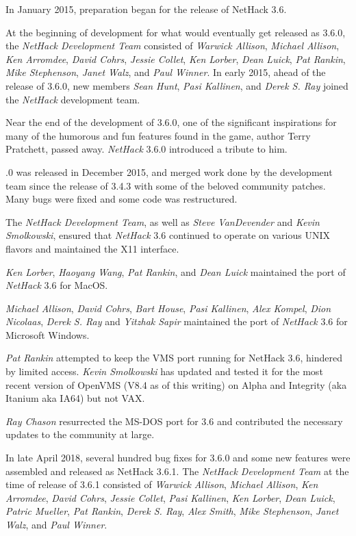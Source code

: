\medskip
In January 2015, preparation began for the release of NetHack 3.6.

\medskip
At the beginning of development for what would eventually get released as
3.6.0, the {\it NetHack Development Team} consisted of {\it Warwick Allison},
{\it Michael Allison}, {\it Ken Arromdee},
{\it David Cohrs}, {\it Jessie Collet},
{\it Ken Lorber}, {\it Dean Luick}, {\it Pat Rankin},
{\it Mike Stephenson}, {\it Janet Walz}, and {\it Paul Winner}.
In early 2015, ahead of the release of 3.6.0, new members
{\it Sean Hunt}, {\it Pasi Kallinen}, and {\it Derek S. Ray}
joined the {\it NetHack\/} development team.

\medskip
Near the end of the development of 3.6.0, one of the significant inspirations
for many of the humorous and fun features found in the game,
author Terry Pratchett, passed away. {\it NetHack\/} 3.6.0 introduced
a tribute to him.

.0 was released in December 2015, and merged work done by the development
team since the release of 3.4.3 with some of the beloved community
patches.  Many bugs were fixed and some code was restructured.

\medskip
The {\it NetHack Development Team}, as well as {\it Steve VanDevender} and
{\it Kevin Smolkowski}, ensured that {\it NetHack\/} 3.6 continued to
operate on various UNIX flavors and maintained the X11 interface.

\medskip
{\it Ken Lorber}, {\it Haoyang Wang}, {\it Pat Rankin}, and {\it Dean Luick}
maintained the port of {\it NetHack\/} 3.6 for MacOS.

\medskip
{\it Michael Allison}, {\it David Cohrs}, {\it Bart House},
{\it Pasi Kallinen}, {\it Alex Kompel}, {\it Dion Nicolaas},
{\it Derek S. Ray} and  {\it Yitzhak Sapir}
maintained the port of  {\it NetHack\/} 3.6 for Microsoft Windows.

\medskip
{\it Pat Rankin} attempted to keep the VMS port running for NetHack 3.6,
hindered by limited access.  {\it Kevin Smolkowski} has updated and tested it
for the most recent version of OpenVMS (V8.4 as of this writing) on Alpha
and Integrity (aka Itanium aka IA64) but not VAX.

\medskip
{\it Ray Chason}  resurrected the MS-DOS port for 3.6 and contributed the
necessary updates to the community at large.

\medskip
In late April 2018, several hundred bug fixes for 3.6.0 and some new features
were assembled and released as NetHack 3.6.1.
The {\it NetHack Development Team} at the
time of release of 3.6.1 consisted of
{\it Warwick Allison}, {\it Michael Allison}, {\it Ken Arromdee},
{\it David Cohrs}, {\it Jessie Collet},
{\it Pasi Kallinen}, {\it Ken Lorber}, {\it Dean Luick},
{\it Patric Mueller}, {\it Pat Rankin}, {\it Derek S. Ray},
{\it Alex Smith}, {\it Mike Stephenson}, {\it Janet Walz}, and
{\it Paul Winner}.

